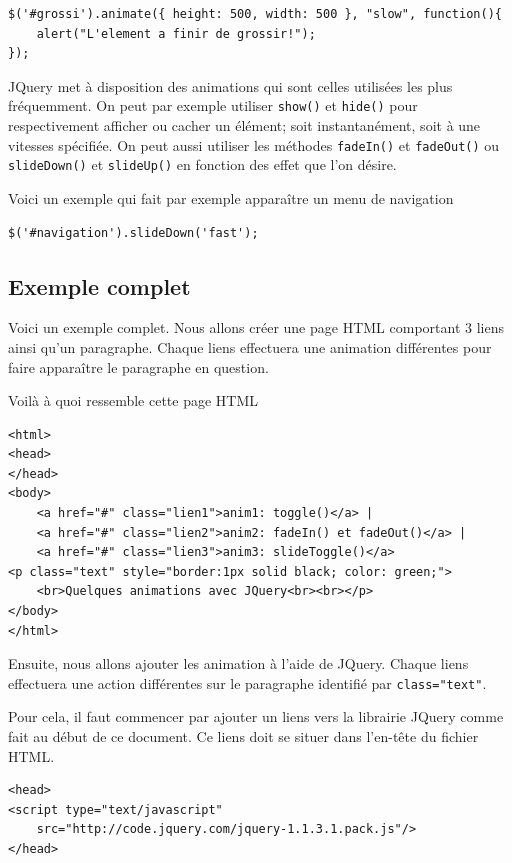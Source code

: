\documentclass[10pt,a4paper,titlepage]{article}
\begin{document}
\begin{lstlisting}
$('#grossi').animate({ height: 500, width: 500 }, "slow", function(){
    alert("L'element a finir de grossir!");
});
\end{lstlisting}

JQuery met à disposition des animations qui sont celles utilisées les plus fréquemment. On peut par exemple utiliser \texttt{show()} et \texttt{hide()} pour respectivement afficher ou cacher un élément; soit instantanément, soit à une vitesses spécifiée. On peut aussi utiliser les méthodes \texttt{fadeIn()} et \texttt{fadeOut()} ou \texttt{slideDown()} et \texttt{slideUp()} en fonction des effet que l'on désire. 


Voici un exemple qui fait par exemple apparaître un menu de navigation

\begin{lstlisting}
$('#navigation').slideDown('fast');
\end{lstlisting}

\subsection{Exemple complet}

Voici un exemple complet. Nous allons créer une page HTML comportant 3 liens ainsi qu'un paragraphe. Chaque liens effectuera une animation différentes pour faire apparaître le paragraphe en question.

Voilà à quoi ressemble cette page HTML

\begin{lstlisting}
<html>
<head>
</head>
<body>
	<a href="#" class="lien1">anim1: toggle()</a> | 
	<a href="#" class="lien2">anim2: fadeIn() et fadeOut()</a> | 
	<a href="#" class="lien3">anim3: slideToggle()</a>
<p class="text" style="border:1px solid black; color: green;">
	<br>Quelques animations avec JQuery<br><br></p>
</body>
</html>
\end{lstlisting}

Ensuite, nous allons ajouter les animation à l'aide de JQuery. Chaque liens effectuera une action différentes sur le paragraphe identifié par \texttt{class="text"}.

Pour cela, il faut commencer par ajouter un liens vers la librairie JQuery comme fait au début de ce document. Ce liens doit se situer dans l'en-tête du fichier HTML.

\begin{lstlisting}
<head>
<script type="text/javascript" 
	src="http://code.jquery.com/jquery-1.1.3.1.pack.js"/>
</head>
\end{lstlisting}
\end{document}
